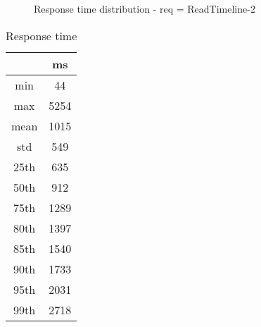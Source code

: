 \begin{minipage}{0.75\linewidth}
\begin{figure}[h]
\begin{adjustbox}{max width=1.0\linewidth, keepaspectratio}
  \end{adjustbox}
  \caption{Response time distribution - req = ReadTimeline-2}
\end{figure}
\end{minipage}\hfill\begin{minipage}{0.18\linewidth}
\begin{table}[h]
\begin{tabular}{|cc|}
\hline
\textbf{} & \textbf{ms}\\ \hline
 \Xhline{0.005\arrayrulewidth}
min & 44\\
 \Xhline{0.005\arrayrulewidth}
max & 5254\\
 \Xhline{0.005\arrayrulewidth}
mean & 1015\\
 \Xhline{0.005\arrayrulewidth}
std & 549\\
\hline
\hline
 \Xhline{0.005\arrayrulewidth}
25th & 635\\
 \Xhline{0.005\arrayrulewidth}
50th & 912\\
 \Xhline{0.005\arrayrulewidth}
75th & 1289\\
 \Xhline{0.005\arrayrulewidth}
80th & 1397\\
 \Xhline{0.005\arrayrulewidth}
85th & 1540\\
 \Xhline{0.005\arrayrulewidth}
90th & 1733\\
 \Xhline{0.005\arrayrulewidth}
95th & 2031\\
 \Xhline{0.005\arrayrulewidth}
99th & 2718\\
\hline
\end{tabular}
\caption{Response time}
\end{table}
\end{minipage}\hfill
